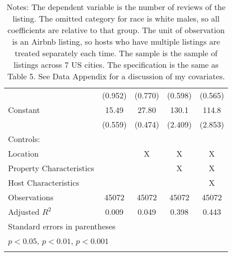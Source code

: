 {\begin{longtable}{l*{4}{c}}
                    &     (0.952)         &     (0.770)         &     (0.598)         &     (0.565)         \\
[1em]
Constant            &       15.49\sym{***}&       27.80\sym{***}&       130.1\sym{***}&       114.8\sym{***}\\
                    &     (0.559)         &     (0.474)         &     (2.409)         &     (2.853)         \\
\hline
Controls:        \\
\hspace{3mm} Location  &                &       X         &       X         &       X         \\
\hspace{3mm} Property Characteristics  &                &                &       X         &       X         \\
\hspace{3mm} Host Characteristics  &                &                &                &       X         \\
\hline
Observations        &       45072         &       45072         &       45072         &       45072         \\
Adjusted \(R^{2}\)  &       0.009         &       0.049         &       0.398         &       0.443         \\
\hline\hline
\multicolumn{5}{l}{\footnotesize Standard errors in parentheses}\\
\multicolumn{5}{l}{\footnotesize \sym{*} \(p<0.05\), \sym{**} \(p<0.01\), \sym{***} \(p<0.001\)}\\
\caption*{Notes: The dependent variable is the number of reviews of the listing. The omitted category for race is white males, so all coefficients are relative to that group. The unit of observation is an Airbnb listing, so hosts who have multiple listings are treated separately each time. The sample is the sample of listings across 7 US cities. The specification is the same as Table 5. See Data Appendix for a discussion of my covariates.}
\end{longtable}
}


\begin{comment}
[1em]
Middle-aged         &       4.358\sym{***}&       5.298\sym{***}&       0.634         &      -0.101         \\
&     (0.585)         &     (0.562)         &     (0.371)         &     (0.361)         \\
[1em]
Old ($>$65)           &       13.30\sym{***}&       14.75\sym{***}&       2.328         &       0.741         \\
&     (2.130)         &     (1.981)         &     (1.358)         &     (1.265)         \\
\end{comment}
